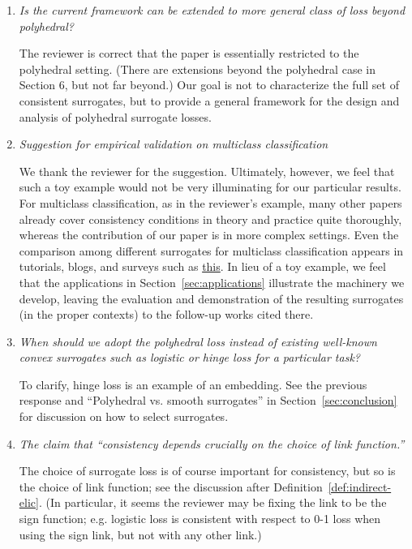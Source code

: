 \documentclass[a4paper]{article}
\begin{document}
\begin{enumerate}
	\item \emph{Is the current framework can be extended to more general class of loss beyond polyhedral?}
	
	The reviewer is correct that the paper is essentially restricted to the polyhedral setting.  (There are extensions beyond the polyhedral case in Section 6, but not far beyond.)  Our goal is not to characterize the full set of consistent surrogates, but to provide a general framework for the design and analysis of polyhedral surrogate losses.
	
	\item \emph{Suggestion for empirical validation on multiclass classification}
	
	We thank the reviewer for the suggestion.  Ultimately, however, we feel that such a toy example would not be very illuminating for our particular results.  For multiclass classification, as in the reviewer’s example, many other papers already cover consistency conditions in theory and practice quite thoroughly, whereas the contribution of our paper is in more complex settings.  Even the comparison among different surrogates for multiclass classification appears in tutorials, blogs, and surveys such as \href{https://faculty.ist.psu.edu/vhonavar/Courses/ds310/lossfunc.pdf}{this}. 
	In lieu of a toy example, we feel that the applications in Section~\ref{sec:applications} illustrate the machinery we develop, leaving the evaluation and demonstration of the resulting surrogates (in the proper contexts) to the follow-up works cited there.
	
	\item \emph{When should we adopt the polyhedral loss instead of existing well-known convex surrogates such as logistic or hinge loss for a particular task?}
	
	To clarify, hinge loss is an example of an embedding.  See the previous response and “Polyhedral vs. smooth surrogates” in Section~\ref{sec:conclusion} for discussion on how to select surrogates.
	
	\item \emph{The claim that ``consistency depends crucially on the choice of link function.''}

	The choice of surrogate loss is of course important for consistency, but so is the choice of link function; see the discussion after Definition~\ref{def:indirect-elic}.  
	(In particular, it seems the reviewer may be fixing the link to be the sign function; e.g. logistic loss is consistent with respect to 0-1 loss when using the sign link, but not with any other link.)	
	
\end{enumerate}
\end{document}
